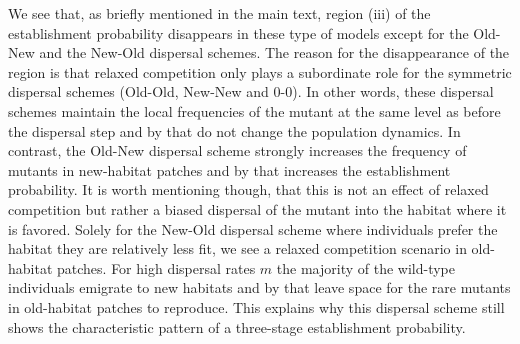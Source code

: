 \documentclass[a4paper,11pt]{scrartcl}
\begin{document}
We see that, as briefly mentioned in the main text, region (iii) of the establishment probability disappears in these type of models except for the Old-New and the New-Old dispersal schemes. The reason for the disappearance of the region is that relaxed competition only plays a subordinate role for the symmetric dispersal schemes (Old-Old, New-New and 0-0). In other words, these dispersal schemes maintain the local frequencies of the mutant at the same level as before the dispersal step and by that do not change the population dynamics. In contrast, the Old-New dispersal scheme strongly increases the frequency of mutants in new-habitat patches and by that increases the establishment probability. It is worth mentioning though, that this is not an effect of relaxed competition but rather a biased dispersal of the mutant into the habitat where it is favored. Solely for the New-Old dispersal scheme where individuals prefer the habitat they are relatively less fit, we see a relaxed competition scenario in old-habitat patches. For high dispersal rates $m$ the majority of the wild-type individuals emigrate to new habitats and by that leave space for the rare mutants in old-habitat patches to reproduce. This explains why this dispersal scheme still shows the characteristic pattern of a three-stage establishment probability.   \newpage 
\end{document}
